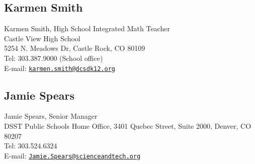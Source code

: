 \documentclass[letterpaper]{article}
\begin{document}
\subsection*{Karmen Smith}
Karmen Smith, High School Integrated Math Teacher
\\ Castle View High School
\\ 5254 N. Meadows Dr, Castle Rock, CO 80109
\\Tel: 303.387.9000 (School office)
\\E-mail: \href{karmen.smith@dcsdk12.org}{\tt karmen.smith@dcsdk12.org}
\subsection*{Jamie Spears}
Jamie Spears, Senior Manager 
\\ DSST Public Schools Home Office, 3401 Quebec Street, Suite 2000, Denver, CO 80207
\\Tel: 303.524.6324
\\ E-mail: \href{Jamie.Spears@scienceandtech.org}{\tt Jamie.Spears@scienceandtech.org}
\end{document}
